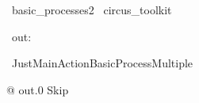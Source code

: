 
\begin{zsection}
  \SECTION\ basic\_processes2 \parents\ circus\_toolkit
\end{zsection}

\begin{circus}
    \circchannel\ out: \nat
\end{circus}


\begin{circus}
    \circprocess\ JustMainActionBasicProcessMultiple ~~\circdef~~ \circbegin
\end{circus}

\begin{circusaction}
    @ out.0 \then Skip
\end{circusaction}

\begin{circus}
    \circend
\end{circus}